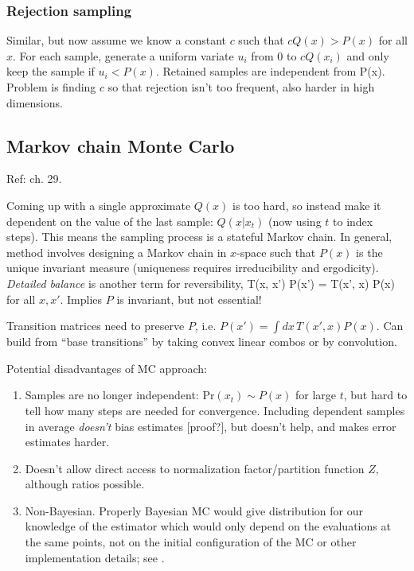\documentclass[notitlepage,openany,11pt]{report}
\theoremstyle{plain}%
\numberwithin{equation}{section}
\begin{document}
\subsubsection{Rejection sampling} 
Similar, but now assume we know a constant $c$ such that $cQ(x) > P(x)$ for all $x$. For each sample, generate a uniform variate $u_{i}$ from $0$ to $cQ(x_{i})$ and only keep the sample if $u_{i} < P(x)$. Retained samples are independent from P(x). Problem is finding $c$ so that rejection isn't too frequent, also harder in high dimensions.

\subsection{Markov chain Monte Carlo} 
Ref: \cite{MacKay:03} ch. 29.

Coming up with a single approximate $Q(x)$ is too hard, so instead make it dependent on the value of the last sample: $Q(x| x_{t})$ (now using $t$ to index steps). This means the sampling process is a stateful Markov chain. In general, method involves designing a Markov chain in $x$-space such that $P(x)$ is the unique invariant measure (uniqueness requires irreducibility and ergodicity). \emph{Detailed balance} is another term for reversibility,
\be
T(x, x') P(x') = T(x', x) P(x)
\ee
for all $x, x'$. Implies $P$ is invariant, but not essential!

Transition matrices need to preserve $P$, i.e. $P(x') = \int \! dx \, T(x', x) P(x)$. Can build from ``base transitions'' by taking convex linear combos or by convolution. 

Potential disadvantages of MC approach:

\begin{enumerate}
\item Samples are no longer independent: $\text{Pr}(x_t) \sim P(x)$ for large $t$, but hard to tell how many steps are needed for convergence. Including dependent samples in average \emph{doesn't} bias estimates [proof?], but doesn't help, and makes error estimates harder.

\item Doesn't allow direct access to normalization factor/partition function $Z$, although ratios possible.

\item Non-Bayesian. Properly Bayesian MC would give distribution for our knowledge of the estimator which would only depend on the evaluations at the same points, not on the initial configuration of the MC or other implementation details; see \citep{GhahramaniRasmussen:03}.
\end{enumerate}
\end{document}
